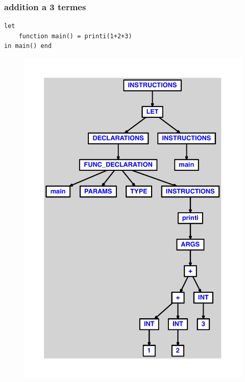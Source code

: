 \documentclass{article}
\begin{document}
\subsubsection{addition a 3 termes}
\begin{lstlisting}
let
	function main() = printi(1+2+3)
in main() end
\end{lstlisting}
\newpage
\begin{figure}[H]
\centering
\includegraphics[max width=\textwidth]{ast/ast_43.pdf}
\end{figure}
\newpage
\end{document}
